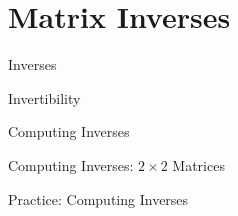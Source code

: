 \section{Matrix Inverses}

\begin{frame}{Inverses}

\end{frame}

\begin{frame}{Invertibility}

\end{frame}

\begin{frame}{Computing Inverses}

\end{frame}

\begin{frame}{Computing Inverses: $2 \times 2$ Matrices}

\end{frame}

\begin{frame}{Practice: Computing Inverses}

\end{frame}
